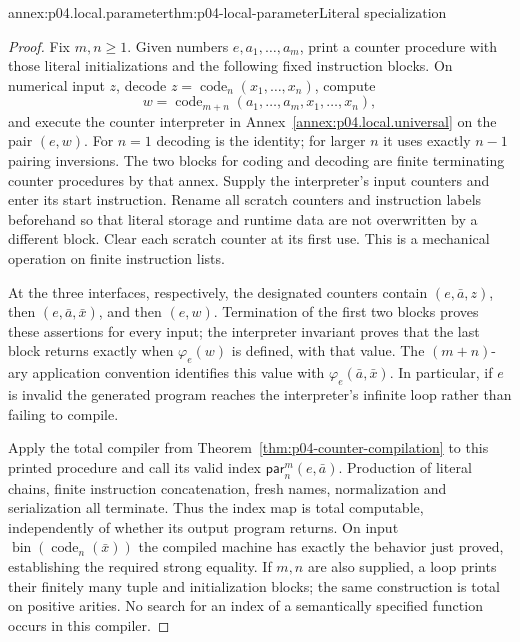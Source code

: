 \begin{annexitem}{annex:p04.local.parameter}{thm:p04-local-parameter}{Literal specialization}
\begin{proof}
Fix \(m,n\geq1\).  Given numbers \(e,a_1,\ldots,a_m\), print a counter
procedure with those literal initializations and the following fixed
instruction blocks.  On numerical input \(z\), decode
\(z=\operatorname{code}_n(x_1,\ldots,x_n)\), compute
\[
  w=\operatorname{code}_{m+n}(a_1,\ldots,a_m,x_1,\ldots,x_n),
\]
and execute the counter interpreter in
Annex~\ref{annex:p04.local.universal} on the pair \((e,w)\).
For \(n=1\) decoding is the identity; for larger \(n\) it uses exactly
\(n-1\) pairing inversions.  The two blocks for coding and decoding are
finite terminating counter procedures by that annex.  Supply the
interpreter's input counters and enter its start instruction.  Rename all
scratch counters and instruction labels beforehand so that literal
storage and runtime data are not overwritten by a different block.
Clear each scratch counter at its first use.  This is a mechanical
operation on finite instruction lists.

At the three interfaces, respectively, the designated counters contain
\((e,\bar a,z)\), then \((e,\bar a,\bar x)\), and then \((e,w)\).
Termination of the first two blocks proves these assertions for every
input; the interpreter invariant proves that the last block returns
exactly when \(\varphi_e(w)\) is defined, with that value.  The
\((m+n)\)-ary application convention identifies this value with
\(\varphi_e(\bar a,\bar x)\).  In particular, if \(e\) is invalid the
generated program reaches the interpreter's infinite loop rather than
failing to compile.

Apply the total compiler from
Theorem~\ref{thm:p04-counter-compilation} to this printed procedure and
call its valid index \(\mathsf{par}_n^m(e,\bar a)\).  Production of
literal chains, finite instruction concatenation, fresh names,
normalization and serialization all terminate.  Thus the index map is
total computable, independently of whether its output program returns.
On input \(\operatorname{bin}(\operatorname{code}_n(\bar x))\) the
compiled machine has exactly the behavior just proved, establishing
the required strong equality.  If \(m,n\) are also supplied, a loop
prints their finitely many tuple and initialization blocks; the same
construction is total on positive arities.  No search for an index of
a semantically specified function occurs in this compiler.
\end{proof}
\end{annexitem}

